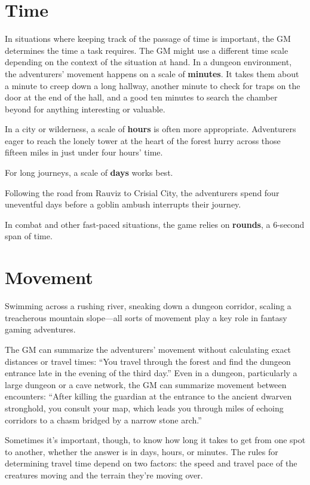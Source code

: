 \section{Time}

In situations where keeping track of the passage of time is important, the GM determines the time a task requires. The GM might use a different time scale depending on the context of the situation at hand. In a dungeon environment, the adventurers' movement happens on a scale of \textbf{minutes}. It takes them about a minute to creep down a long hallway, another minute to check for traps on the door at the end of the hall, and a good ten minutes to search the chamber beyond for anything interesting or valuable.

In a city or wilderness, a scale of \textbf{hours} is often more appropriate. Adventurers eager to reach the lonely tower at the heart of the forest hurry across those fifteen miles in just under four hours' time.

For long journeys, a scale of \textbf{days} works best.

Following the road from Rauviz to Crisial City, the adventurers spend four uneventful days before a goblin ambush interrupts their journey.

In combat and other fast-paced situations, the game relies on \textbf{rounds}, a 6-second span of time.

\section{Movement}

Swimming across a rushing river, sneaking down a dungeon corridor, scaling a treacherous mountain slope—all sorts of movement play a key role in fantasy gaming adventures.

The GM can summarize the adventurers' movement without calculating exact distances or travel times: “You travel through the forest and find the dungeon entrance late in the evening of the third day.” Even in a dungeon, particularly a large dungeon or a cave network, the GM can summarize movement between encounters: “After killing the guardian at the entrance to the ancient dwarven stronghold, you consult your map, which leads you through miles of echoing corridors to a chasm bridged by a narrow stone arch.”

Sometimes it's important, though, to know how long it takes to get from one spot to another, whether the answer is in days, hours, or minutes. The rules for determining travel time depend on two factors: the speed and travel pace of the creatures moving and the terrain they're moving over.

